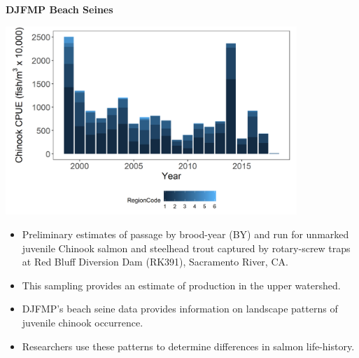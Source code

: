 \documentclass[]{article}\usepackage[]{graphicx}\usepackage[]{color}
\begin{document}
\vspace{0.5cm}

\begin{Row}
  \begin{Cell}{7}
    \begin{center}
      {\bf {\large DJFMP Beach Seines}}
    \end{center}
  \end{Cell}
  \begin{Cell}{6}
  \end{Cell}
\end{Row}


\begin{Row}
  \begin{Cell}{7}
    \begin{center}
      \includegraphics[width=11cm,align=m]{figures/salmon/djfmp_chn_fig.png}
    \end{center}
  \end{Cell}
  \begin{Cell}{6}
    \begin{center}
      \begin{itemize}[leftmargin=*]
        \item Preliminary estimates of passage by brood-year (BY) and run for 
        unmarked juvenile Chinook salmon and steelhead trout captured by rotary-screw 
        traps at Red Bluff Diversion Dam (RK391), Sacramento River, CA.
        \item This sampling provides an estimate of production in the upper watershed.
      \end{itemize}
    \end{center}
    \vspace{3cm} 
    \begin{center}
      \begin{itemize}[leftmargin=*]
        \item DJFMP’s beach seine data provides information on landscape patterns of 
        juvenile chinook occurrence.
        \item Researchers use these patterns to determine differences in salmon 
        life-history.
      \end{itemize}
    \end{center}
  \end{Cell}
\end{Row}
\end{document}
